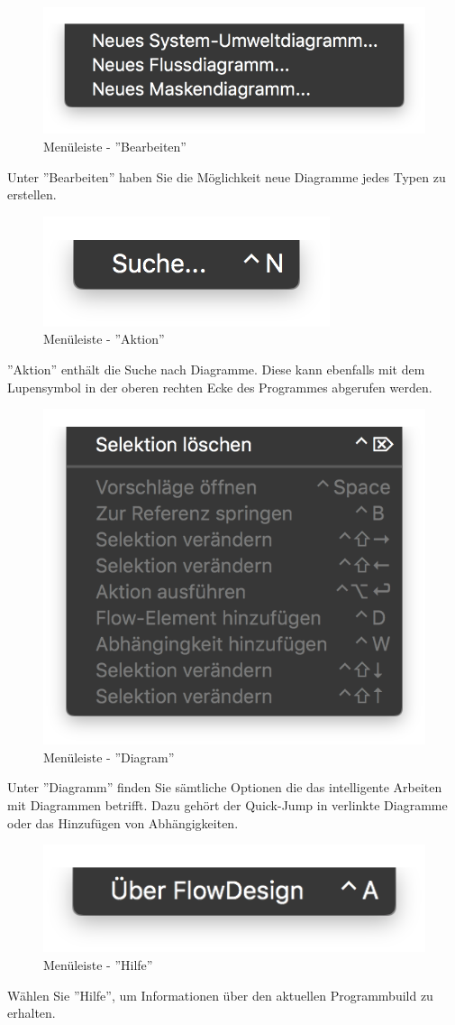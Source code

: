 \begin{figure}[H]
	\centering
	\includegraphics[width=.4\textwidth]{Leiste_Bearbeiten.png}
	\caption{Menüleiste - ''Bearbeiten''}
\end{figure}
Unter ''Bearbeiten'' haben Sie die Möglichkeit neue Diagramme jedes Typen zu erstellen.


\begin{figure}[H]
	\centering
	\includegraphics[width=.4\textwidth]{Leiste_Aktion.png}
	\caption{Menüleiste - ''Aktion''}
\end{figure}
''Aktion'' enthält die Suche nach Diagramme. Diese kann ebenfalls mit dem Lupensymbol in der oberen rechten Ecke des Programmes abgerufen werden.



\begin{figure}[H]
	\centering
	\includegraphics[width=.4\textwidth]{Leiste_Diagram.png}
	\caption{Menüleiste - ''Diagram''}
\end{figure}
Unter ''Diagramm'' finden Sie sämtliche Optionen die das intelligente Arbeiten mit Diagrammen betrifft. Dazu gehört der Quick-Jump in verlinkte Diagramme oder das Hinzufügen von Abhängigkeiten.



\begin{figure}[H]
	\centering
	\includegraphics[width=.4\textwidth]{Leiste_Hilfe.png}
	\caption{Menüleiste - ''Hilfe''}
\end{figure}
Wählen Sie ''Hilfe'', um Informationen über den aktuellen Programmbuild zu erhalten.	






